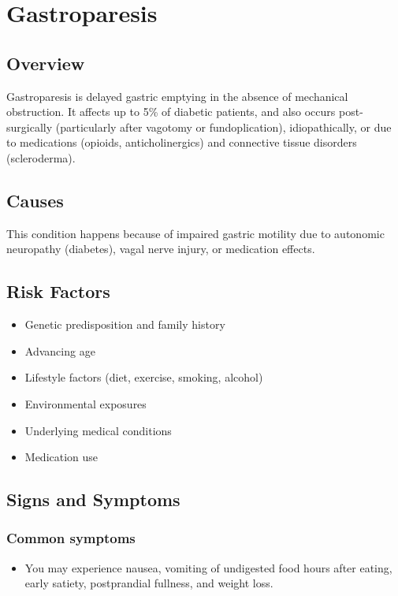 \chapter{Gastroparesis}
\label{sec:Gastroparesis}

\section{Overview}
Gastroparesis is delayed gastric emptying in the absence of mechanical obstruction. It affects up to 5\% of diabetic patients, and also occurs post-surgically (particularly after vagotomy or fundoplication), idiopathically, or due to medications (opioids, anticholinergics) and connective tissue disorders (scleroderma).
\section{Causes}
This condition happens because of impaired gastric motility due to autonomic neuropathy (diabetes), vagal nerve injury, or medication effects.     
\section{Risk Factors}

\begin{itemize}[noitemsep]
  \item Genetic predisposition and family history
  \item Advancing age
  \item Lifestyle factors (diet, exercise, smoking, alcohol)
  \item Environmental exposures
  \item Underlying medical conditions
  \item Medication use
\end{itemize}
\section{Signs and Symptoms}

\subsection{Common symptoms}
\begin{itemize}[noitemsep]
  \item You may experience nausea, vomiting of undigested food hours after eating, early satiety, postprandial fullness, and weight loss. 
  \end{itemize}

